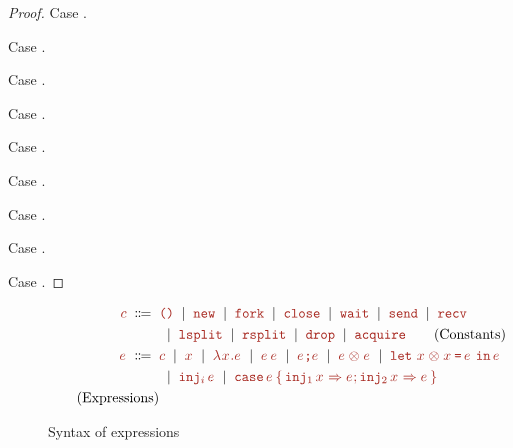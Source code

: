 \documentclass{article}
\begin{document}
\begin{proof}
  Case .

  Case .

  Case .

  Case .

  Case .

  Case .

  Case .

  Case .

  Case .
\end{proof}


\begin{figure}
  \begin{align*}
    \C \grmeq
      & \CUnit
        \grmor \CNew
        \grmor \CFork
        \grmor \CTerm 
        \grmor \CWait
        \grmor \CSend
        \grmor \CRecv
    \\&
    \grmor \CSplit \grmor \CSSplit
    \grmor \CDrop \grmor \CAcq
        \tag{Constants} \\
    \E \grmeq
      & \C \grmor \EVar \grmor \EAbs\EVar\E \grmor \EApp\E\E 
        \grmor \ESeq\E\E
        \grmor \EPair\E\E
        \grmor \ELetPair{\EVar}{\EVar}{\E}{\E} \\
      &  \grmor \EInj i \E 
        \grmor\ECase\E{\EVar}{\E}{\EVar}{\E} \\
        \tag{Expressions}
  \end{align*}
  \caption{Syntax of expressions}
  \label{fig:syntax-expressions}
\end{figure}

\end{document}
